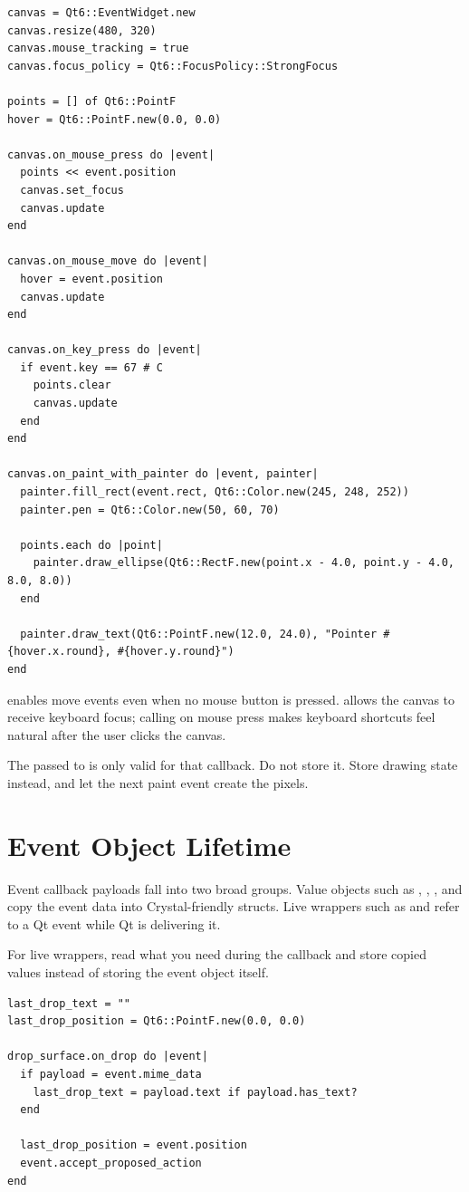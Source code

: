 \begin{lstlisting}[style=crystal]
canvas = Qt6::EventWidget.new
canvas.resize(480, 320)
canvas.mouse_tracking = true
canvas.focus_policy = Qt6::FocusPolicy::StrongFocus

points = [] of Qt6::PointF
hover = Qt6::PointF.new(0.0, 0.0)

canvas.on_mouse_press do |event|
  points << event.position
  canvas.set_focus
  canvas.update
end

canvas.on_mouse_move do |event|
  hover = event.position
  canvas.update
end

canvas.on_key_press do |event|
  if event.key == 67 # C
    points.clear
    canvas.update
  end
end

canvas.on_paint_with_painter do |event, painter|
  painter.fill_rect(event.rect, Qt6::Color.new(245, 248, 252))
  painter.pen = Qt6::Color.new(50, 60, 70)

  points.each do |point|
    painter.draw_ellipse(Qt6::RectF.new(point.x - 4.0, point.y - 4.0, 8.0, 8.0))
  end

  painter.draw_text(Qt6::PointF.new(12.0, 24.0), "Pointer #{hover.x.round}, #{hover.y.round}")
end
\end{lstlisting}

 enables move events even when no mouse button is pressed.  allows the canvas to receive keyboard focus; calling  on mouse press makes keyboard shortcuts feel natural after the user clicks the canvas.

The  passed to  is only valid for that callback. Do not store it. Store drawing state instead, and let the next paint event create the pixels.

\section{Event Object Lifetime}

Event callback payloads fall into two broad groups. Value objects such as , , , and  copy the event data into Crystal-friendly structs. Live wrappers such as  and  refer to a Qt event while Qt is delivering it.

For live wrappers, read what you need during the callback and store copied values instead of storing the event object itself.

\begin{lstlisting}[style=crystal]
last_drop_text = ""
last_drop_position = Qt6::PointF.new(0.0, 0.0)

drop_surface.on_drop do |event|
  if payload = event.mime_data
    last_drop_text = payload.text if payload.has_text?
  end

  last_drop_position = event.position
  event.accept_proposed_action
end
\end{lstlisting}

